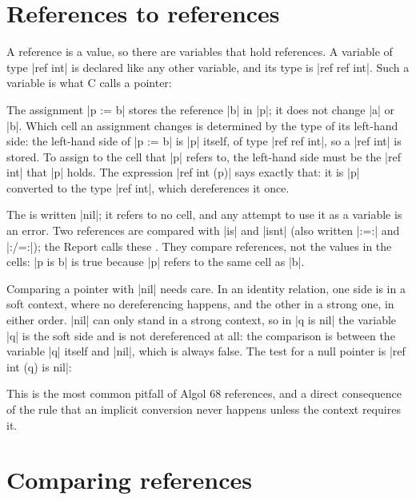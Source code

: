 \section{References to references}\label{sec-pointers}

A reference is a value, so there are variables that hold references. A
variable of type \code|ref int| is declared like any other variable, and
its type is \code|ref ref int|. Such a variable is what C calls a
pointer:


The assignment \code|p := b| stores the reference \code|b| in \code|p|;
it does not change \code|a| or \code|b|. Which cell an assignment changes
is determined by the type of its left-hand side: the left-hand side of
\code|p := b| is \code|p| itself, of type \code|ref ref int|, so a
\code|ref int| is stored. To assign to the cell that \code|p| refers to,
the left-hand side must be the \code|ref int| that \code|p| holds. The
expression \code|ref int (p)| says exactly that: it is \code|p| converted
to the type \code|ref int|, which dereferences it once.

The  is written \code|nil|; it refers to no cell, and
any attempt to use it as a variable is an error. Two references are
compared with \code|is| and \code|isnt| (also written \code|:=:| and
\code|:/=:|); the Report calls these . They
compare references, not the values in the cells: \code|p is b| is true
because \code|p| refers to the same cell as \code|b|.

Comparing a pointer with \code|nil| needs care. In an identity relation,
one side is in a soft context, where no dereferencing happens, and the
other in a strong one, in either order. \code|nil| can only stand in a
strong context, so in \code|q is nil| the variable \code|q| is the soft
side and is not dereferenced at all: the comparison is between the
variable \code|q| itself and \code|nil|, which is always false. The test
for a null pointer is \code|ref int (q) is nil|:


This is the most common pitfall of Algol 68 references, and a direct
consequence of the rule that an implicit conversion never happens
unless the context requires it.

\section{Comparing references}\label{sec-identity}

